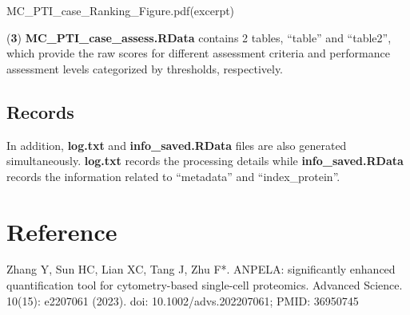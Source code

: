 \documentclass[]{article}
\begin{document}
MC\_PTI\_case\_Ranking\_Figure.pdf(excerpt)

(\textbf{3}) \textbf{MC\_PTI\_case\_assess.RData} contains 2 tables, ``table'' and ``table2'', which provide the raw scores for different assessment criteria and performance assessment levels categorized by thresholds, respectively.

\subsection{Records}\label{records}

In addition, \textbf{log.txt} and \textbf{info\_saved.RData} files are also generated simultaneously. \textbf{log.txt} records the processing details while \textbf{info\_saved.RData} records the information related to ``metadata'' and ``index\_protein''.

\section{Reference}\label{reference}

Zhang Y, Sun HC, Lian XC, Tang J, Zhu F*. ANPELA: significantly enhanced quantification tool for cytometry-based single-cell proteomics. Advanced Science. 10(15): e2207061 (2023). doi: 10.1002/advs.202207061; PMID: 36950745
\end{document}
